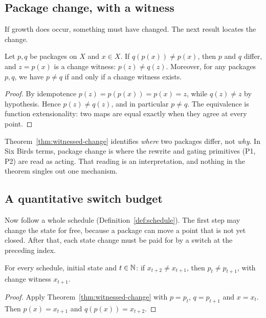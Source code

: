 \subsection{Package change, with a witness}

If growth does occur, something must have changed. The next result locates the change.

\begin{theorem}\label{thm:witnessed-change}
Let $p,q$ be packages on $X$ and $x\in X$. If $q(p(x))\neq p(x)$, then $p$ and $q$ differ, and $z=p(x)$ is a change witness: $p(z)\neq q(z)$. Moreover, for any packages $p,q$, we have $p\neq q$ if and only if a change witness exists.
\end{theorem}

\begin{proof}
By idempotence $p(z)=p(p(x))=p(x)=z$, while $q(z)\neq z$ by hypothesis. Hence $p(z)\neq q(z)$, and in particular $p\neq q$. The equivalence is function extensionality: two maps are equal exactly when they agree at every point.
\end{proof}

Theorem~\ref{thm:witnessed-change} identifies \emph{where} two packages differ, not \emph{why}. In Six Birds terms, package change is where the rewrite and gating primitives (P1, P2) are read as acting. That reading is an interpretation, and nothing in the theorem singles out one mechanism.

\subsection{A quantitative switch budget}

Now follow a whole schedule (Definition~\ref{def:schedule}). The first step may change the state for free, because a package can move a point that is not yet closed. After that, each state change must be paid for by a switch at the preceding index.

\begin{lemma}\label{lem:orbit-switch}
For every schedule, initial state and $t\in\mathbb{N}$: if $x_{t+2}\neq x_{t+1}$, then $p_t\neq p_{t+1}$, with change witness $x_{t+1}$.
\end{lemma}

\begin{proof}
Apply Theorem~\ref{thm:witnessed-change} with $p=p_t$, $q=p_{t+1}$ and $x=x_t$. Then $p(x)=x_{t+1}$ and $q(p(x))=x_{t+2}$.
\end{proof}


